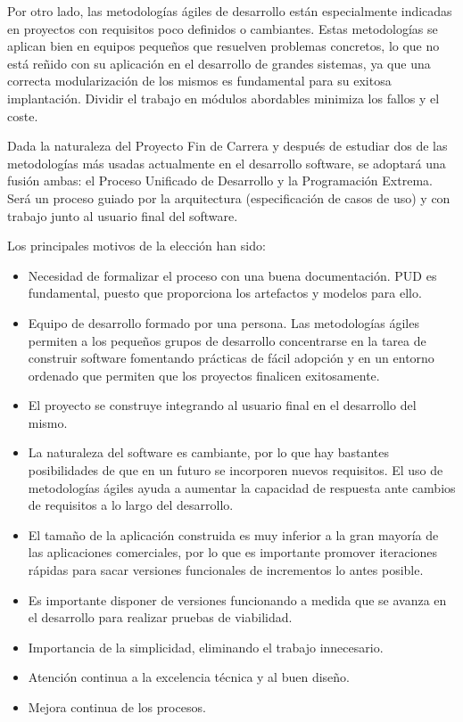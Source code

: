     Por otro lado, las metodologías ágiles de desarrollo están especialmente indicadas en proyectos con requisitos poco definidos o cambiantes. Estas metodologías se aplican bien en equipos pequeños que resuelven problemas concretos, lo que no está reñido con su aplicación en el desarrollo de grandes sistemas, ya que una correcta modularización de los mismos es fundamental para su exitosa implantación. Dividir el trabajo en módulos abordables minimiza los fallos y el coste.
    
    Dada la naturaleza del Proyecto Fin de Carrera y después de estudiar dos de las metodologías más usadas actualmente en el desarrollo software, se adoptará una fusión ambas: el Proceso Unificado de Desarrollo y la Programación Extrema. Será un proceso guiado por la arquitectura (especificación de casos de uso) y con trabajo junto al usuario final del software. 
    
    Los principales motivos de la elección han sido:
    
    \begin{itemize}
      \item Necesidad de formalizar el proceso con una buena documentación. PUD es fundamental, puesto que proporciona los artefactos y modelos para ello.
      \item Equipo de desarrollo formado por una persona. Las metodologías ágiles permiten a los pequeños grupos de desarrollo concentrarse en la tarea de construir software fomentando prácticas de fácil adopción y en un entorno ordenado que permiten que los proyectos finalicen exitosamente.
      \item El proyecto se construye integrando al usuario final en el desarrollo del mismo. 
      \item La naturaleza del software es cambiante, por lo que hay bastantes posibilidades de que en un futuro se incorporen nuevos requisitos. El uso de metodologías ágiles ayuda a aumentar la capacidad de respuesta ante cambios de requisitos a lo largo del desarrollo.
      \item El tamaño de la aplicación construida es muy inferior a la gran mayoría de las aplicaciones comerciales, por lo que es importante promover iteraciones rápidas para sacar versiones funcionales de incrementos lo antes posible.
      \item Es importante disponer de versiones funcionando a medida que se avanza en el desarrollo para realizar pruebas de viabilidad.
      \item Importancia de la simplicidad, eliminando el trabajo innecesario.
      \item Atención continua a la excelencia técnica y al buen diseño.
      \item Mejora continua de los procesos.
    \end{itemize}  
    
